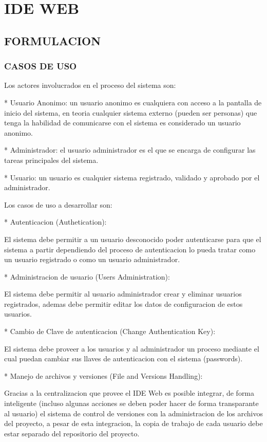 
\section{IDE WEB}
\subsection{FORMULACION}
\subsubsection{CASOS DE USO}

Los actores involucrados en el proceso del sistema son:

* Usuario Anonimo: un usuario anonimo es cualquiera con acceso a la pantalla de inicio del sistema, en teoria cualquier sistema externo (pueden ser personas) que tenga la habilidad de comunicarse con el sistema es considerado un usuario anonimo.

* Administrador: el usuario administrador es el que se encarga de configurar las tareas principales del sistema.

* Usuario: un usuario es cualquier sistema registrado, validado y aprobado por el administrador.

Los casos de uso a desarrollar son:


* Autenticacion (Authetication):

El sistema debe permitir a un usuario desconocido poder autenticarse para que el sistema a partir dependiendo del proceso de autenticacion lo pueda tratar como un usuario registrado o como un usuario administrador.

* Administracion de usuario (Users Administration):

El sistema debe permitir al usuario administrador crear y eliminar usuarios registrados, ademas debe permitir editar los datos de configuracion de estos usuarios.

* Cambio de Clave de autenticacion (Change Authentication Key):

El sistema debe proveer a los usuarios y al administrador un proceso mediante el cual puedan cambiar sus llaves de autenticacion con el sistema (passwords).


* Manejo de archivos y versiones (File and Versions Handling):

Gracias a la centralizacion que provee el IDE Web es posible integrar, de forma inteligente (incluso algunas acciones se deben poder hacer de forma transparante al usuario) el sistema de control de versiones con la administracion de los archivos del proyecto, a pesar de esta integracion, la copia de trabajo de cada usuario debe estar separado del repositorio del proyecto.

